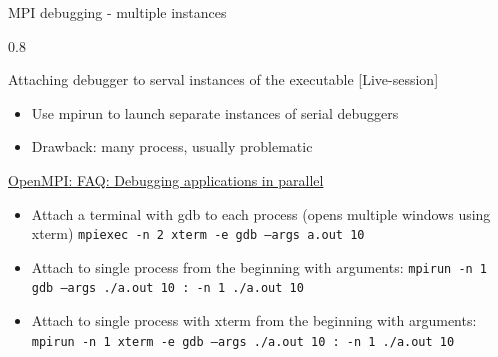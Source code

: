 \documentclass[aspectratio=1610]{beamer}
\newenvironment{centeredblock}[2][0.8\textwidth]
{ %
	\begin{center}
		\begin{varwidth}{#1} %
			\begin{block}{#2}
				\centering
			}
			{ %
			\end{block}
		\end{varwidth}
	\end{center}
}
\begin{document}
	\begin{frame}[fragile]{MPI debugging - multiple instances}
		\begin{centeredblock}{Attaching debugger to serval instances of the executable [Live-session]}
			\begin{itemize}
				\item Use mpirun to launch separate instances of serial debuggers
				\item Drawback: many process, usually problematic
			\end{itemize}
			\href{https://www.open-mpi.org/faq/?category=debugging#serial-debuggers}{OpenMPI: FAQ: Debugging applications in parallel}
			
			\begin{itemize}
				\item Attach a terminal with gdb to each process (opens multiple windows using xterm)
				\texttt{mpiexec -n 2 xterm -e gdb --args a.out 10}
				\item Attach to single process from the beginning with arguments: \texttt{mpirun -n 1 gdb --args ./a.out 10 : -n 1 ./a.out 10}
				\item Attach to single process with xterm from the beginning with arguments: \texttt{mpirun -n 1 xterm -e gdb --args ./a.out 10 : -n 1 ./a.out 10}
			\end{itemize}
		\end{centeredblock}
	\end{frame}
\end{document}
